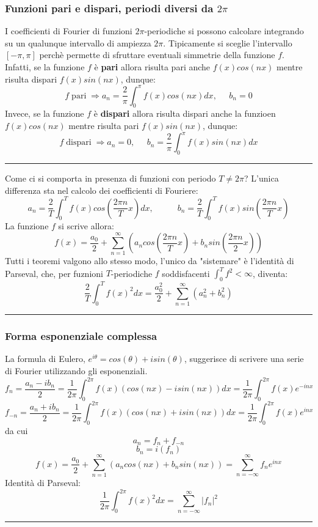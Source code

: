 \subsubsection*{Funzioni pari e dispari, periodi diversi da $2\pi$}
I coefficienti di Fourier di funzioni $2\pi$-periodiche si possono calcolare integrando su un qualunque intervallo di ampiezza $2\pi$. Tipicamente si sceglie l'intervallo $[-\pi, \pi]$ perchè permette di sfruttare eventuali simmetrie della funzione $f$.\newline
Infatti, se la funzione $f$ è \textbf{pari} allora risulta pari anche $f(x)cos(nx)$ mentre risulta dispari $f(x)sin(nx)$, dunque:
\[
    f \; \text{pari}\; \Rightarrow a_n = \frac{2}{\pi} \int_{0}^{\pi}f(x) cos(nx) dx , \;\;\;\;\;b_n = 0
\]
Invece, se la funzione $f$ è \textbf{dispari} allora risulta dispari anche la funzioen $f(x)cos(nx)$ mentre risulta pari $f(x) sin(nx)$, dunque:
\[
    f \; \text{dispari}\; \Rightarrow a_n = 0, \;\;\;\;\;b_n = \frac{2}{\pi} \int_{0}^{\pi} f(x) sin(nx)dx
\]
\newline
\rule{\textwidth}{0,4pt}\newline
Come ci si comporta in presenza di funzioni con periodo $T \neq 2\pi$?\newline
L'unica differenza sta nel calcolo dei coefficienti di Fouriere:
\[
    a_n = \frac{2}{T}\int_{0}^{T}f(x) cos\left( \frac{2\pi n}{T}x \right) dx, \;\;\;\;\; \;\;\;\;\; b_n = \frac{2}{T} \int_{0}^{T}f(x) sin\left( \frac{2\pi n}{T}x \right)
\]
La funzione $f$ si scrive allora:
\[
    f(x) = \frac{a_0}{2} + \sum_{n=1}^{\infty} \left( a_n cos\left( \frac{2\pi n}{T}x \right) + b_n sin \left( \frac{2\pi n}{2}x \right) \right)
\]
Tutti i teoremi valgono allo stesso modo, l'unico da "sistemare" è l'identità di Parseval, che, per fuznioni $T$-periodiche $f$ soddisfacenti $\int_{0}^{T} f^2 < \infty$, diventa:
\[
    \frac{2}{T} \int_{0}^{T}f(x)^2 dx = \frac{a_0^2}{2} + \sum_{n=1}^{\infty} (a_n^2 + b_n^2)
\]
\rule{\textwidth}{0,4pt}
\subsubsection*{Forma esponenziale complessa}
La formula di Eulero, $e^{i \theta} = cos(\theta) + i sin(\theta)$, suggerisce di scrivere una serie di Fourier utilizzando gli esponenziali.
\[
    f_n =\frac{a_n-ib_n}{2} = \frac{1}{2\pi} \int_{0}^{2\pi}f(x)(cos(nx) - i sin(nx))dx = \frac{1}{2\pi} \int_{0}^{2\pi}f(x) e^{-inx}
\]
\[
    f_{-n} =\frac{a_n + ib_n}{2} = \frac{1}{2\pi} \int_{0}^{2\pi}f(x)(cos(nx) + i sin(nx))dx = \frac{1}{2\pi} \int_{0}^{2\pi}f(x) e^{inx}
\]
da cui
\[
    a_n = f_n + f_{-n}
\]
\[
    b_n = i (f_n)
\]
\[
    f(x) = \frac{a_0}{2} + \sum_{n=1}^{\infty} \left( a_n cos(nx) + b_n sin(nx) \right) = \sum_{n=-\infty}^{\infty} f_n e^{inx}
\]
\newline
Identità di Parseval:
\[
    \frac{1}{2\pi}\int_{0}^{2\pi}f(x)^2dx = \sum_{n=-\infty}^{\infty}|f_n|^2
\]
\rule{\textwidth}{2pt}
